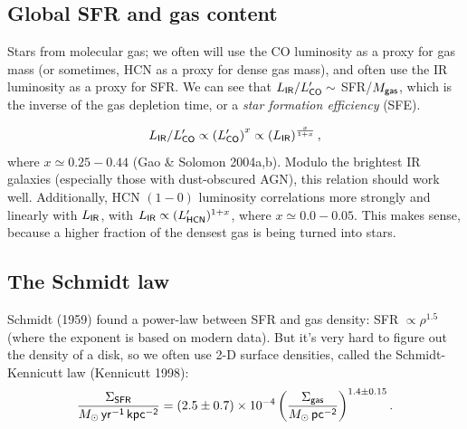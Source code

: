 \documentclass{tufte-handout}
\renewcommand{\rm}{\sf}
\newcommand{\e}[1]{\times 10^{#1}}
\begin{document}
\subsection{Global SFR and gas content}
Stars from molecular gas; we often will use the CO luminosity as a proxy for gas mass (or sometimes, HCN as a proxy for dense gas mass), and often use the IR luminosity as a proxy for SFR. We can see that $L_{\rm IR}/L_{\rm CO}' \sim$ SFR/$M_{\rm gas}$, which is the inverse of the gas depletion time, or a \textit{star formation efficiency} (SFE).

\[L_{\rm IR}/L_{\rm CO}' \propto \left (L_{\rm CO}'\right )^x \propto \left (L_{\rm IR}\right )^{\frac{x}{1+x}},\]
where $x \simeq 0.25-0.44$ (Gao \& Solomon 2004a,b). Modulo the brightest IR galaxies (especially those with dust-obscured AGN), this relation should work well. Additionally, HCN $(1-0)$ luminosity correlations more strongly and linearly with $L_{\rm IR}$, with $L_{\rm IR}\propto (L_{\rm HCN}')^{1+x}$, where $x \simeq 0.0-0.05$. This makes sense, because a higher fraction of the densest gas is being turned into stars.

\subsection{The Schmidt law}
Schmidt (1959) found a power-law between SFR and gas density: SFR $\propto \rho^{1.5}$ (where the exponent is based on modern data). But it's very hard to figure out the density of a disk, so we often use 2-D surface densities, called the Schmidt-Kennicutt law (Kennicutt 1998):
\begin{equation}
\frac{\Sigma_{\rm SFR}}{M_\odot \rm\, yr^{-1}\, kpc^{-2}} = (2.5 \pm 0.7)\e{-4} \left (\frac{\Sigma_{\rm gas}}{M_\odot \, \rm pc^{-2}}\right )^{1.4 \pm 0.15}.
\end{equation}
\end{document}

